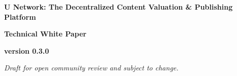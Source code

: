 \documentclass[12pt,twoside]{mitthesis}
\begin{document}
\begin{center}
\large\textbf{U Network: The Decentralized Content Valuation \& Publishing Platform}
\end{center}
\vspace{1cm}


\begin{center}
\large\textbf{Technical White Paper}
\end{center}

\begin{center}
\textbf{version 0.3.0}

\end{center}
\vspace{4cm}

\begin{center}
\textit{Draft for open community review and subject to change.}
\end{center}

\pagestyle{empty}




\pagestyle{plain}














\appendix


%




\end{document}
